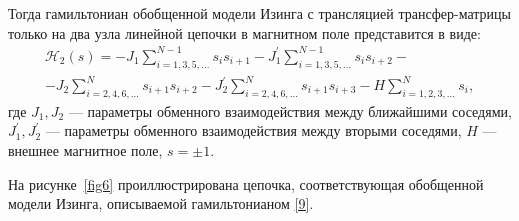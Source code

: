 Тогда гамильтониан обобщенной модели Изинга с трансляцией трансфер-матрицы только на два узла линейной цепочки в магнитном поле представится в виде:
\begin{multline}
\mathcal{H}_2(s)=-J_1\sum_{i=1,3,5,\dots}^{N-1} s_i s_{i+1} - J_1^{'}\sum_{i=1,3,5,\dots}^{N-1} s_i s_{i+2} -\\-J_2\sum_{i=2,4,6,\dots}^{N} s_{i+1} s_{i+2} -J_2^{'}\sum_{i=2,4,6,\dots}^{N} s_{i+1} s_{i+3} - H\sum_{i=1,2,3,\dots}^{N}s_i
\label{9},
\end{multline}
где $J_1, J_2$ --- параметры обменного взаимодействия между ближайшими соседями, $J^{'}_1, J^{'}_2$ --- параметры обменного взаимодействия между вторыми соседями, $H$ --- внешнее магнитное поле, $s=\pm 1$.


На рисунке~\ref{fig6} проиллюстрирована цепочка, соответствующая обобщенной модели Изинга, описываемой гамильтонианом \eqref{9}.

